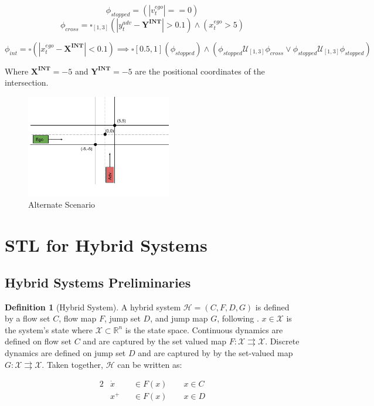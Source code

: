 \documentclass{article}
\theoremstyle{definition}
\newtheorem{definition}{Definition}[section]
\begin{document}
\begin{equation}
    \phi_{stopped} = (|v_{t}^{ego}|==0)
\end{equation}
\begin{equation}
    \phi_{cross} = \square_{[1,3]}(|y_{t}^{adv} - \mathbf{Y^{INT}}| > 0.1) \land (x_{t}^{ego} > 5)
\end{equation}

\begin{equation}
    \phi_{int} = \square(|x_{t}^{ego} -\mathbf{X^{INT}}|  < 0.1) \implies
    \square{[0.5,1]}(\phi_{stopped}) \land (\phi_{stopped}\mathcal{U}_{[1, 3]}\phi_{cross} \lor \phi_{stopped}\mathcal{U}_{[1,3]}\phi_{stopped})
\end{equation}

Where $\mathbf{X^{INT}} = -5$ and $\mathbf{Y^{INT}} = -5$
are the positional coordinates of the intersection.

\begin{figure}[H] 
\centering
\includegraphics[width=2.5in]{Figures/intersection_stl.png}
\caption{Alternate Scenario}
\label{fig:alt_intersection}
\end{figure}


\section{STL for Hybrid Systems}

\subsection{Hybrid Systems Preliminaries }

\begin{definition}[Hybrid System]
    A hybrid system $\mathcal{H} = (C,F,D,G)$ is defined by a flow set $C$, flow map
    $F$, jump set $D$, and jump map $G$, following \cite{hybrid_2012}. $x\in
    \mathcal{X}$ is the system's state where $\mathcal{X}\subset\mathbb{R}^n$ is the state
    space. Continuous dynamics are defined on flow set $C$ and are captured by the set valued map
    $F:\mathcal{X}\rightrightarrows\mathcal{X}$. Discrete dynamics are
    defined on jump set $D$ and are captured by by the set-valued map
    $G:\mathcal{X}\rightrightarrows\mathcal{X}$. Taken together,
    $\mathcal{H}$ can be written as:

    \begin{alignat}{2}
        &\dot{x} &&\in F(x) \quad\quad x \in C\\
        &x^{+} &&\in F(x) \quad\quad x \in D \nonumber
    \end{alignat}

\end{definition}
\end{document}

